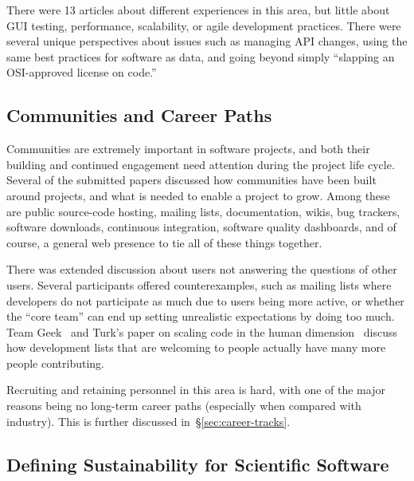 \documentclass[11pt, oneside]{amsart}
\begin{document}
There were 13 articles about different experiences in this area, but little
about GUI testing, performance, scalability, or agile development practices.
There were several unique perspectives about issues such as managing API
changes, using the same best practices for software as data, and going beyond
simply ``slapping an OSI-approved license on code.''

\subsection{Communities and Career Paths}

Communities are extremely important in software projects, and both their
building and continued engagement need attention during the project life cycle.
Several of the submitted papers discussed how communities have been built around
projects, and what is needed to enable a project to grow. Among these are 
public source-code hosting, mailing lists, documentation, wikis, bug trackers, software
downloads, continuous integration, software quality dashboards, and of course,
a general web presence to tie all of these things together.

There was extended discussion about users not answering the questions of other
users. Several participants
offered counterexamples, such as mailing lists where developers do not participate
as much due to users being more active, or whether the ``core
team'' can end up setting unrealistic expectations by doing too much. Team Geek~\cite{opac-b1134063}
and Turk's paper on scaling code in the human dimension~\cite{Turk:2013:SCH:2484762.2484782}  discuss how development
lists that are welcoming to people actually have many more people contributing.

Recruiting and retaining personnel in this area is hard,
with one of the major reasons being no long-term career paths (especially when
compared with industry). This is further discussed in~\S\ref{sec:career-tracks}.

%

\subsection{Defining Sustainability for Scientific Software}
\end{document}
